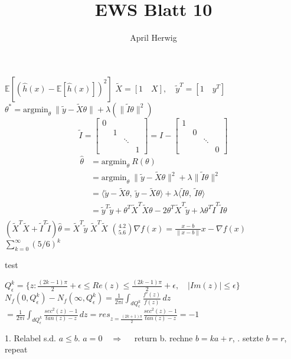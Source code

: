 \documentclass[draft]{article}
\title{EWS Blatt 10}
\author{April Herwig}
\begin{document}
\maketitle

$\mathbb{E}\left[ \left( \hat{h}(x) - \mathbb{E}\left[ \hat{h}(x) \right] \right) ^2 \right]$
$ \tilde{X} = [1\quad X], \quad\tilde{y}^T = [1\quad y^T] $
$ \theta ^{*} = \text{argmin}_\theta\  \| \tilde{y} - \tilde{X}\theta \| + \lambda\left(\| \tilde{I}\theta \|^2 \right)  $
\[
    \tilde{I}=\begin{bmatrix}
        0 & & & \\
        & 1 & & \\
        & & \ddots & \\
        & & & 1
    \end{bmatrix} = I - \begin{bmatrix}
        1 & & & \\
        & 0 & & \\
        & & \ddots & \\
        & & & 0 
    \end{bmatrix}
\]
\begin{align*}
    \hat{\theta} &= \text{argmin}_\theta\ R(\theta) \\
    &= \text{argmin}_\theta\ \| \tilde{y} - \tilde{X}\theta \|^2 + \lambda\| \tilde{I}\theta \| ^2 \\
    &= \langle \tilde{y} - \tilde{X}\theta,\ \tilde{y} - \tilde{X}\theta \rangle + \lambda\langle\tilde{I}\theta,\ \tilde{I}\theta\rangle \\
    &= \tilde{y}^T \tilde{y} +\theta^T\tilde{X}^T\tilde{X}\theta - 2\theta^T\tilde{X}^T\tilde{y} + \lambda\theta^T\tilde{I}^T\tilde{I}\theta \\
\end{align*}
$ \left(\tilde{X}^T\tilde{X} + \tilde{I}^T\tilde{I}\right)\hat{\theta} = \tilde{X}^T\tilde{y} $
$ \tilde{X}^T\tilde{X} $
$ \binom{4.2}{5.6}  \nabla f(x) = \frac{x - b}{\| x - b \|} x - \nabla f(x) $
$ \sum_{k = 0}^{\infty} (5/6)^k  $

\begin{verbatim*}
    test
\end{verbatim*}

$ Q_\epsilon^k = \{z : \frac{(2k-1)\pi}{2} + \epsilon \leq Re(z) \leq \frac{(2k-1)\pi}{2} + \epsilon, \quad |Im(z)| \leq \epsilon \} $ 
$ N_f(0, Q_\epsilon^k) - N_f(\infty, Q_\epsilon^k) = \frac{1}{2\pi i} \int_{dQ_\epsilon^k} \frac{f'(z)}{f(z)} \,dz $
$ =  \frac{1}{2\pi i} \int_{dQ_\epsilon^k} \frac{sec^2(z)-1}{tan(z)-z} \,dz = res_{z = \frac{(2k+1)\pi}{2}} \frac{sec^2(z)-1}{tan(z)-z} = -1$ 

1. Relabel s.d. $a \leq b$. $a = 0\quad\Rightarrow\quad$  return b. rechne $b = ka+r$, . setzte $b = r$, repeat
\end{document}
